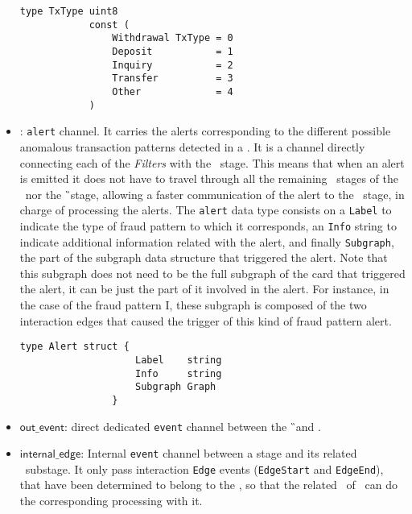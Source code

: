 \begin{itemize}
    \begin{center}
    \lstset{style=golangStyle}
    \begin{lstlisting}[caption={\texttt{TxType} Data type, for the different interaction types}]
            type TxType uint8
            const (
            	Withdrawal TxType = 0
            	Deposit           = 1
            	Inquiry           = 2
            	Transfer          = 3
            	Other             = 4
            )
    \end{lstlisting}
    \end{center}
    
    \item \alertch: \texttt{alert} channel. It carries the alerts corresponding to the different possible anomalous transaction patterns detected in a \filter. It is a channel directly connecting each of the \emph{Filters} with the \sink\ stage. This means that when an alert is emitted it does not have to travel through all the remaining \F\ stages of the \DP\ nor the \G\ stage, allowing a faster communication of the alert to the \Sk\ stage, in charge of processing the alerts. The \texttt{alert} data type consists on a \texttt{Label} to indicate the type of fraud pattern to which it corresponds, an \texttt{Info} string to indicate additional information related with the alert, and finally \texttt{Subgraph}, the part of the subgraph data structure that triggered the alert. Note that this subgraph does not need to be the full subgraph of the card that triggered the alert, it can be just the part of it involved in the alert. For instance, in the case of the fraud pattern I, these subgraph is composed of the two interaction edges that caused the trigger of this kind of fraud pattern alert.
    \begin{center}
    \lstset{style=golangStyle}
    \begin{lstlisting}[caption={\texttt{Alert} data type}]
                type Alert struct {
                	Label    string        
                	Info     string        
                	Subgraph Graph         
                }
    \end{lstlisting}
    \end{center}
    \item $\mathsf{out\_event}$: direct dedicated \texttt{event} channel between the \G\ and \Sk. 
    \item $\mathsf{internal\_edge}$: Internal \texttt{event} channel between a \F stage and its related \FW\ substage. It only pass interaction \texttt{Edge} events (\texttt{EdgeStart} and \texttt{EdgeEnd}), that have been determined to belong to the \filter, so that the related \FW\ of \F\ can do the corresponding processing with it.
  \end{itemize}

